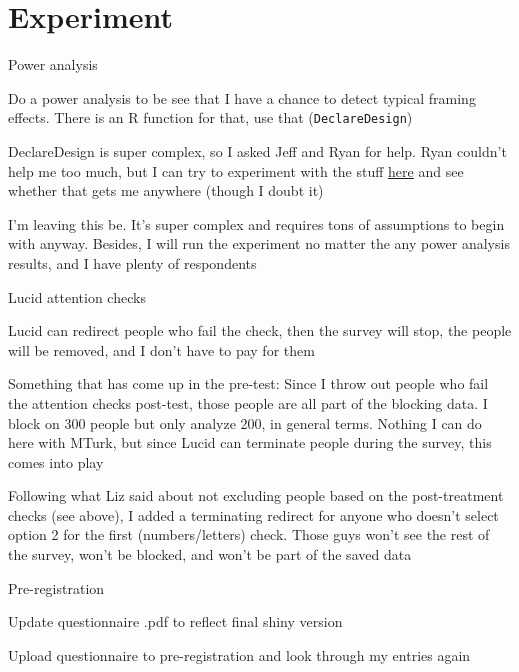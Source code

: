 \documentclass[12pt]{article}
\begin{document}
\section*{Experiment}
	\begin{coi}
		\item Power analysis
			\begin{coi}
				\item Do a power analysis to be see that I have a chance to detect typical framing effects. There is an R function for that, use that (\texttt{DeclareDesign})
				\item DeclareDesign is super complex, so I asked Jeff and Ryan for help. Ryan couldn't help me too much, but I can try to experiment with the stuff \href{https://declaredesign.org/r/fabricatr/articles/variable_generation.html}{here} and see whether that gets me anywhere (though I doubt it)
				\item I'm leaving this be. It's super complex and requires tons of assumptions to begin with anyway. Besides, I will run the experiment no matter the any power analysis results, and I have plenty of respondents
			\end{coi}
		\item Lucid attention checks
			\begin{coi}
				\item Lucid can redirect people who fail the check, then the survey will stop, the people will be removed, and I don't have to pay for them
				\item Something that has come up in the pre-test: Since I throw out people who fail the attention checks post-test, those people are all part of the blocking data. I block on 300 people but only analyze 200, in general terms. Nothing I can do here with MTurk, but since Lucid can terminate people during the survey, this comes into play
				\item Following what Liz said about not excluding people based on the post-treatment checks (see above), I added a terminating redirect for anyone who doesn't select option 2 for the first (numbers/letters) check. Those guys won't see the rest of the survey, won't be blocked, and won't be part of the saved data
			\end{coi}
		\item Pre-registration
			\begin{coi}
				\item Update questionnaire .pdf to reflect final shiny version
				\item Upload questionnaire to pre-registration and look through my entries again

\end{coi}
\end{coi}
\end{document}
